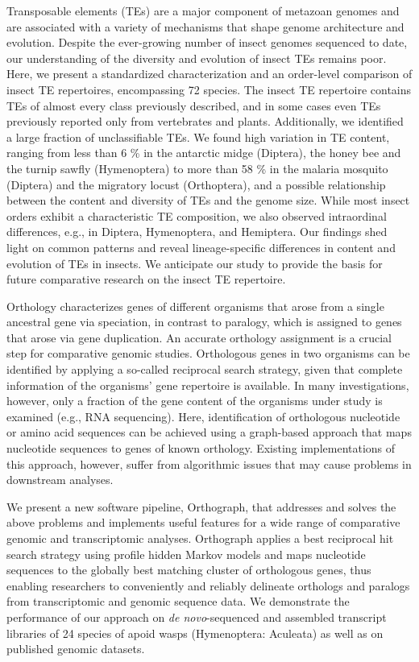 
Transposable elements (TEs) are a major component of metazoan genomes
and are associated with a variety of mechanisms that shape genome
architecture and evolution. Despite the ever-growing number of insect
genomes sequenced to date, our understanding of the diversity and
evolution of insect TEs remains poor. Here, we present a standardized
characterization and an order-level comparison of insect TE repertoires,
encompassing 72 species. The insect TE repertoire contains TEs of almost
every class previously described, and in some cases even TEs previously
reported only from vertebrates and plants. Additionally, we identified a
large fraction of unclassifiable TEs. We found high variation in TE
content, ranging from less than 6 \% in the antarctic midge (Diptera),
the honey bee and the turnip sawfly (Hymenoptera) to more than 58 \% in
the malaria mosquito (Diptera) and the migratory locust (Orthoptera),
and a possible relationship between the content and diversity of TEs and
the genome size. While most insect orders exhibit a characteristic TE
composition, we also observed intraordinal differences, e.g., in
Diptera, Hymenoptera, and Hemiptera. Our findings shed light on common
patterns and reveal lineage-specific differences in content and
evolution of TEs in insects. We anticipate our study to provide the
basis for future comparative research on the insect TE repertoire.%


Orthology characterizes genes of different organisms that arose from a
single ancestral gene via speciation, in contrast to paralogy, which is
assigned to genes that arose via gene duplication. An accurate orthology
assignment is a crucial step for comparative genomic studies.
Orthologous genes in two organisms can be identified by applying a
so-called reciprocal search strategy, given that complete information of
the organisms' gene repertoire is available. In many investigations,
however, only a fraction of the gene content of the organisms under
study is examined (e.g., RNA sequencing).  Here, identification of
orthologous nucleotide or amino acid sequences can be achieved using a
graph-based approach that maps nucleotide sequences to genes of known
orthology. Existing implementations of this approach, however, suffer
from algorithmic issues that may cause problems in downstream analyses.

We present a new software pipeline, Orthograph, that addresses and
solves the above problems and implements useful features for a wide
range of comparative genomic and transcriptomic analyses.  Orthograph
applies a best reciprocal hit search strategy using profile hidden
Markov models and maps nucleotide sequences to the globally best
matching cluster of orthologous genes, thus enabling researchers to
conveniently and reliably delineate orthologs and paralogs from
transcriptomic and genomic sequence data. We demonstrate the performance
of our approach on \emph{de novo}-sequenced and assembled transcript
libraries of 24 species of apoid wasps (Hymenoptera: Aculeata) as well
as on published genomic datasets.


